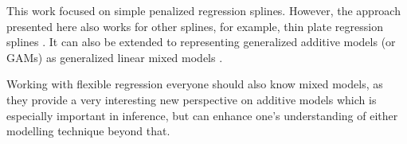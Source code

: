 \documentclass[12pt]{article}
\begin{document}
This work focused on simple penalized regression splines. However, the approach presented here also works for other splines, for example, thin plate regression splines \cite{wood2011fast}. It can also be extended to representing generalized additive models (or GAMs) as generalized linear mixed models \cite{kneib2006mixed}.

Working with flexible regression everyone should also know mixed models, as they provide a very interesting new perspective on additive models which is especially important in inference, but can enhance one's understanding of either modelling technique beyond that.




\newpage
\printbibliography
\end{document}
